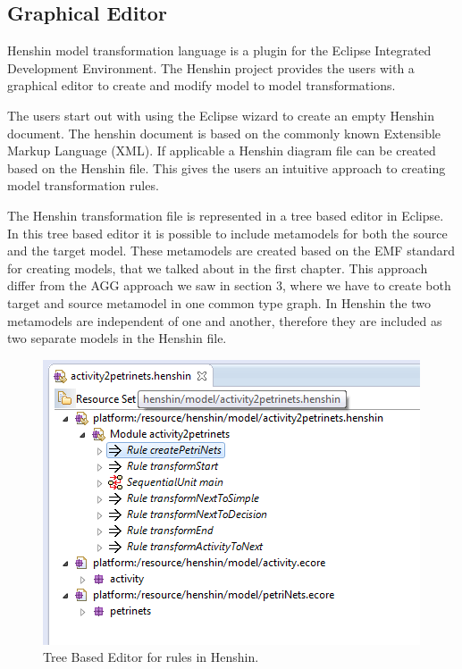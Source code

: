 \documentclass[pdftex,11pt,a4paper]{article}
\begin{document}
\subsection{Graphical Editor}
\noindent Henshin model transformation language is a plugin for the Eclipse
Integrated Development Environment\cite{Eclipse}. The Henshin project provides
the users with a graphical editor to create and modify model to model
transformations. 

The users start out with using the Eclipse wizard to create an empty Henshin
document. The henshin document is based on the commonly known Extensible Markup
Language (XML)\cite{XML}. If applicable a Henshin diagram file can be created
based on the Henshin file. This gives the users an intuitive approach to
creating model transformation rules.

The Henshin transformation file is represented in a tree based editor in
Eclipse. In this tree based editor it is possible to include metamodels for both
the source and the target model. These metamodels are created based on the EMF
standard for creating models, that we talked about in the first chapter.
This approach differ from the AGG approach we saw in section 3, where we have
to create both target and source metamodel in one common type graph. In Henshin
the two metamodels are independent of one and another, therefore they are
included as two separate models in the Henshin file. 

\begin{figure}[H]
	\centering
	\includegraphics[scale=0.7]{figures/Henshin_TreeEdtiro.png}
	\caption{Tree Based Editor for rules in Henshin.}
	\label{fig:Henshin_TreeEditor}
\end{figure}
\end{document}
